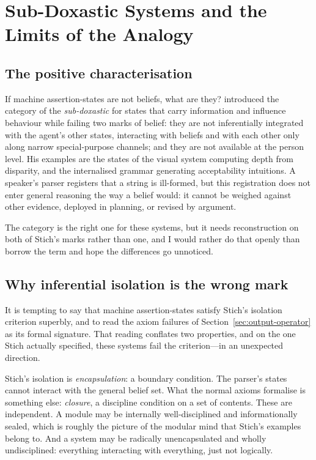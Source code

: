 \section{Sub-Doxastic Systems and the Limits of the Analogy}
\label{sec:subdoxastic}

\subsection{The positive characterisation}

If machine assertion-states are not beliefs, what are they?
\citet{stich1978} introduced the category of the \emph{sub-doxastic} for states
that carry information and influence behaviour while failing two marks of belief:
they are not inferentially integrated with the agent's other states, interacting
with beliefs and with each other only along narrow special-purpose channels; and
they are not available at the person level. His examples are the states of the
visual system computing depth from disparity, and the internalised grammar
generating acceptability intuitions. A speaker's parser registers that a string
is ill-formed, but this registration does not enter general reasoning the way a
belief would: it cannot be weighed against other evidence, deployed in planning,
or revised by argument.

The category is the right one for these systems, but it needs reconstruction on
both of Stich's marks rather than one, and I would rather do that openly than
borrow the term and hope the differences go unnoticed.

\subsection{Why inferential isolation is the wrong mark}
\label{sec:isolation}

It is tempting to say that machine assertion-states satisfy Stich's
isolation criterion superbly, and to read the axiom failures of
Section~\ref{sec:output-operator} as its formal signature. That reading conflates
two properties, and on the one Stich actually specified, these systems fail the
criterion---in an unexpected direction.

Stich's isolation is \emph{encapsulation}: a boundary condition. The parser's
states cannot interact with the general belief set. What the normal axioms
formalise is something else: \emph{closure}, a discipline condition on a set of
contents. These are independent. A module may be internally well-disciplined and
informationally sealed, which is roughly the picture of the modular mind that
Stich's examples belong to. And a system may be radically unencapsulated and
wholly undisciplined: everything interacting with everything, just not logically.

